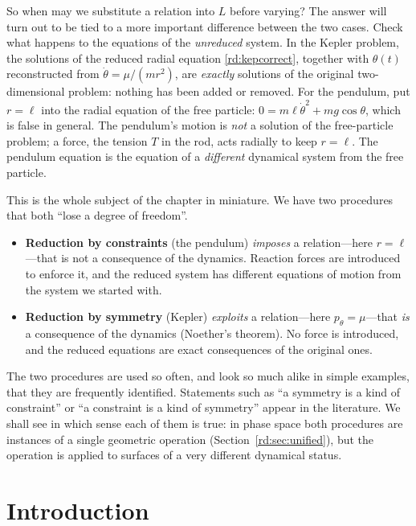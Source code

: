 So when may we substitute a relation into $L$ before varying? The
answer will turn out to be tied to a more important difference
between the two cases. Check what happens to the equations of the
\emph{unreduced} system. In the Kepler problem, the solutions of
the reduced radial equation \eqref{rd:kepcorrect}, together with
$\theta(t)$ reconstructed from $\dot\theta=\mu/(mr^2)$, are
\emph{exactly} solutions of the original two-dimensional problem:
nothing has been added or removed. For the pendulum, put $r=\ell$
into the radial equation of the free particle:
$0=m\ell\dot\theta^2+mg\cos\theta$, which is false in general. The
pendulum's motion is \emph{not} a solution of the free-particle
problem; a force, the tension $T$ in the rod, acts radially to
keep $r=\ell$. The pendulum equation is the equation of a
\emph{different} dynamical system from the free particle.

This is the whole subject of the chapter in miniature. We have two
procedures that both ``lose a degree of freedom''.

\begin{itemize}
\item \textbf{Reduction by constraints} (the pendulum)
    \emph{imposes} a relation---here $r=\ell$---that is not a
        consequence of the dynamics. Reaction forces are
        introduced to enforce it, and the reduced system has
        different equations of motion from the system we started
        with.
\item \textbf{Reduction by symmetry} (Kepler) \emph{exploits} a
    relation---here $p_\theta=\mu$---that \emph{is} a consequence
        of the dynamics (Noether's theorem). No force is
        introduced, and the reduced equations are exact
        consequences of the original ones.
\end{itemize}

The two procedures are used so often, and look so much alike in
simple examples, that they are frequently identified. Statements
such as ``a symmetry is a kind of constraint'' or ``a constraint
is a kind of symmetry'' appear in the literature. We shall see in
which sense each of them is true: in phase space both procedures
are instances of a single geometric operation
(Section~\ref{rd:sec:unified}), but the operation is applied to
surfaces of a very different dynamical status.

\section{Introduction}

